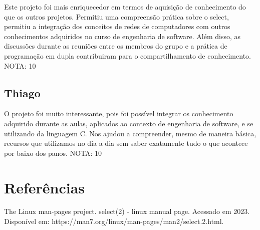 \documentclass[a4paper]{article}
\begin{document}
Este projeto foi mais enriquecedor em termos de aquisição de conhecimento do que os outros projetos. Permitiu uma compreensão prática sobre o select, permitiu a integração dos conceitos de redes de computadores com outros conhecimentos adquiridos no curso de engenharia de software. Além disso, as discussões durante as reuniões entre os membros do grupo e a prática de programação em dupla contribuiram para o compartilhamento de conhecimento.
NOTA: 10

\subsection{Thiago}

O projeto foi muito interessante, pois foi possível integrar os conhecimento adquirido durante as aulas, aplicados ao contexto de engenharia de software, e se utilizando da linguagem C. Nos ajudou a compreender, mesmo de maneira básica, recursos que utilizamos no dia a dia sem saber exatamente tudo o que acontece por baixo dos panos. 
NOTA: 10

\section{Referências}

The Linux man-pages project. select(2) - linux manual page. Acessado em 2023.
Disponível em: https://man7.org/linux/man-pages/man2/select.2.html. 
\end{document}
